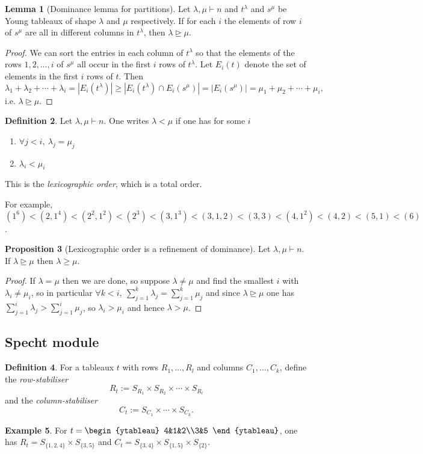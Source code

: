 \documentclass{article}
\theoremstyle{definition}
\newtheorem{defn}{Definition}[subsection]
\newtheorem{prop}[defn]{Proposition}
\newtheorem{lemma}[defn]{Lemma}
\newtheorem{example}[defn]{Example}
\begin{document}
\begin{lemma}[Dominance lemma for partitions]
\label{lemma:dompart}
Let $\lambda,\mu\vdash n$ and $t^\lambda$ and $s^\mu$ be Young tableaux of shape $\lambda$ and $\mu$ respectively. If for each $i$ the elements of row $i$ of $s^\mu$ are all in different columns in $t^\lambda$, then $\lambda\unrhd\mu$.
\end{lemma}
\begin{proof}
We can sort the entries in each column of $t^\lambda$ so that the elements of the rows $1,2,\ldots,i$ of $s^\mu$ all occur in the first $i$ rows of $t^\lambda$. Let $E_i(t)$ denote the set of elements in the first $i$ rows of $t$. Then
\[
\lambda_1+\lambda_2+\cdots+\lambda_i=|E_i(t^\lambda)|\geq |E_i(t^\lambda)\cap E_i(s^\mu)|=|E_i(s^\mu)|=\mu_1+\mu_2+\cdots+\mu_i,
\]
i.e. $\lambda\unrhd\mu$.
\end{proof}

\begin{defn}
Let $\lambda,\mu\vdash n$. One writes $\lambda<\mu$ if one has for some $i$
\begin{enumerate}
\item $\forall j<i,\ \lambda_j=\mu_j$
\item $\lambda_i<\mu_i$
\end{enumerate}
This is the \textit{lexicographic order}, which is a total order.

For example, $(1^6)<(2,1^4)<(2^2,1^2)<(2^3)<(3,1^3)<(3,1,2)<(3,3)<(4,1^2)<(4,2)<(5,1)<(6)$.
\end{defn}

\begin{prop}[Lexicographic order is a refinement of dominance]
Let $\lambda,\mu\vdash n$. If $\lambda\unrhd\mu$ then $\lambda\geq\mu$.
\end{prop}
\begin{proof}
If $\lambda=\mu$ then we are done, so suppose $\lambda\neq\mu$ and find the smallest $i$ with $\lambda_i\neq\mu_i$, so in particular $\forall k<i,\ \sum_{j=1}^k \lambda_j=\sum_{j=1}^k\mu_j$ and since $\lambda\unrhd\mu$ one has $\sum_{j=1}^i \lambda_j>\sum_{j=1}^i\mu_j$, so $\lambda_i>\mu_i$ and hence $\lambda>\mu$.
\end{proof}

\subsection{Specht module}
\begin{defn}
For a tableaux $t$ with rows $R_1,\ldots,R_l$ and columns $C_1,\ldots,C_k$, define the \textit{row-stabiliser}
\[
R_t:=S_{R_1}\times S_{R_2}\times\cdots\times S_{R_l}
\]
and the \textit{column-stabiliser}
\[
C_t:=S_{C_1}\times\cdots\times S_{C_k}.
\]
\end{defn}
\begin{example}
For $t=\begin{ytableau}
4&1&2\\3&5
\end{ytableau}$, one has $R_t=S_{\{1,2,4\}}\times S_{\{3,5\}}$ and $C_t=S_{\{3,4\}}\times S_{\{1,5\}}\times S_{\{2\}}$.
\end{example}
\end{document}
